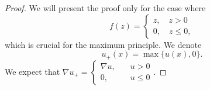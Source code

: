 \documentclass{report}
\begin{document}
\begin{proof}
    We will present the proof only for the case where
    \begin{equation*}
        f(z) = 
        \begin{cases*}
            z, \quad z > 0 \\
            0, \quad z \leq 0,
        \end{cases*}
    \end{equation*}
    which is crucial for the maximum principle. We denote
    \[
        u_{+}(x) = \max\{u(x), 0\}.
    \]
    We expect that \(\nabla u_{+} = \left\{\begin{aligned}
        \nabla u, & \quad u > 0 \\
        0, & \quad u \leq 0
    \end{aligned}\right.\). 
    

\end{proof}
\end{document}
